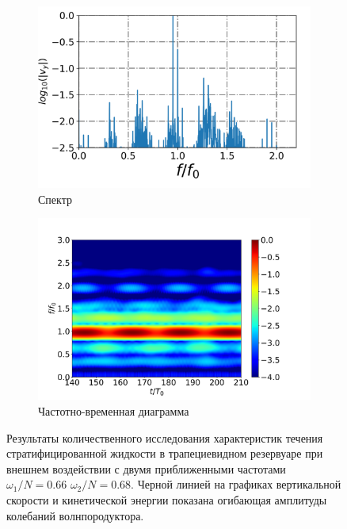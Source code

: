 \documentclass[utf8x]{G7-32} %
\begin{document}
\begin{figure}[h!]
\begin{subfigure}[с]{0.45\textwidth}
    \includegraphics[width=1\textwidth]{../pics/H40L60N1ap05dp20w1p63Deltawp05Biharm/spectrumX35p6Y11p2.png}
    \caption{Спектр}
  \end{subfigure}
  \begin{subfigure}[с]{0.45\textwidth}
    \includegraphics[width=1\textwidth]{../pics/H40L60N1ap05dp20w1p63Deltawp05Biharm/TFspectrumX35p6Y11p2N200.png}
    \caption{Частотно-временная диаграмма}
    \label{}
  \end{subfigure}
  \caption{Результаты количественного исследования характеристик течения стратифицированной жидкости в трапециевидном резервуаре при внешнем воздействии с двумя приближенными частотами $\omega_1/N=0.66$ $\omega_2/N=0.68$. Черной линией  на графиках вертикальной скорости и кинетической энергии показана огибающая амплитуды колебаний волнпородуктора.}
  \label{fig:biharmVyap005-1}
\end{figure}
\end{document}
